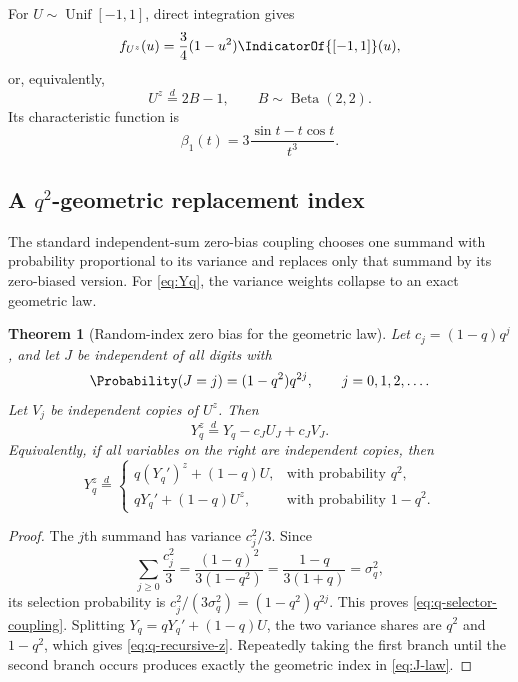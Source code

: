\documentclass[11pt,oneside]{article}
\newtheorem{theorem}{Theorem}[section]
\theoremstyle{definition}
\theoremstyle{remark}
\begin{document}
For $U\sim\operatorname{Unif}[-1,1]$, direct integration gives
\begin{equation}
 f_{U^z}(u)=\frac34(1-u^2)\IndicatorOf{[-1,1]}(u),          \label{eq:uniform-z-density}
\end{equation}
or, equivalently,
\begin{equation}
 U^z\stackrel d=2B-1,
 \qquad B\sim\operatorname{Beta}(2,2).              \label{eq:uniform-z-beta}
\end{equation}
Its characteristic function is
\begin{equation}
 \beta_1(t)=3\frac{\sin t-t\cos t}{t^3}.           \label{eq:beta1-cf}
\end{equation}

\subsection{A \texorpdfstring{$q^2$}{q-squared}-geometric replacement index}

The standard independent-sum zero-bias coupling chooses one summand with
probability proportional to its variance and replaces only that summand by its
zero-biased version.  For \eqref{eq:Yq}, the variance weights collapse to an
exact geometric law.

\begin{theorem}[Random-index zero bias for the geometric law]
\label{thm:q-selector}
Let $c_j=(1-q)q^j$, and let $J$ be independent of all digits with
\begin{equation}
 \Probability(J=j)=(1-q^2)q^{2j},\qquad j=0,1,2,\ldots.     \label{eq:J-law}
\end{equation}
Let $V_j$ be independent copies of $U^z$.  Then
\begin{equation}
 Y_q^z\stackrel d=
 Y_q-c_JU_J+c_JV_J.                                 \label{eq:q-selector-coupling}
\end{equation}
Equivalently, if all variables on the right are independent copies, then
\begin{equation}
 Y_q^z\stackrel d=
 \begin{cases}
 q(Y_q')^z+(1-q)U, &\text{with probability }q^2,\\
 qY_q'+(1-q)U^z,  &\text{with probability }1-q^2.
 \end{cases}                                       \label{eq:q-recursive-z}
\end{equation}
\end{theorem}

\begin{proof}
The $j$th summand has variance $c_j^2/3$.  Since
\[
 \sum_{j\ge0}\frac{c_j^2}{3}
 =\frac{(1-q)^2}{3(1-q^2)}
 =\frac{1-q}{3(1+q)}=\sigma_q^2,
\]
its selection probability is $c_j^2/(3\sigma_q^2)=(1-q^2)q^{2j}$.
This proves \eqref{eq:q-selector-coupling}.  Splitting
$Y_q=qY_q'+(1-q)U$, the two variance shares are $q^2$ and $1-q^2$,
which gives \eqref{eq:q-recursive-z}.  Repeatedly taking the first branch until
the second branch occurs produces exactly the geometric index in
\eqref{eq:J-law}.
\end{proof}
\end{document}
